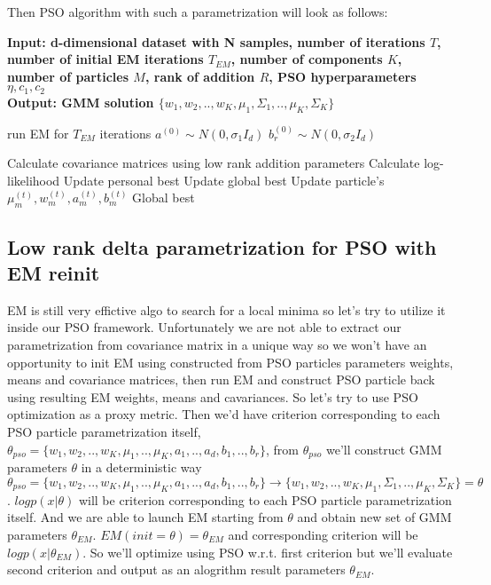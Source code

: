 \documentclass[a4paper]{article}
\begin{document}
 Then PSO algorithm with such a parametrization will look as follows:
 \begin{algorithm}
    \caption{}\label{alg:cap}
    \hspace*{\algorithmicindent} \textbf{Input: d-dimensional dataset with N samples, number of iterations $T$, number of initial EM iterations $T_{EM}$, 
    number of components $K$, number of particles $M$, rank of addition $R$,
    PSO hyperparameters $\eta, c_1, c_2$} \\
    \hspace*{\algorithmicindent} \textbf{Output: GMM solution $\{w_1, w_2, .., w_K, \mu_1, \Sigma_1, .., \mu_K, \Sigma_K\}$} 
    \begin{algorithmic}
    \State run EM for $T_{EM}$ iterations
        \State $a^{(0)}\sim N(0, \sigma_1I_d)$ 
            \State $b^{(0)}_r \sim N(0, \sigma_2 I_d)$
        \EndFor
    \EndFor
    
            \State Calculate covariance matrices using low rank addition parameters
            \State Calculate log-likelihood
            \State Update personal best
         \EndFor
         \State Update global best
            \State Update particle's $\mu_m^{(t)}, w_m^{(t)}, a_m^{(t)}, b_m^{(t)}$
         \EndFor
     \EndFor
     \State \Return Global best
     \end{algorithmic}
     \end{algorithm}

\subsection{Low rank delta parametrization for PSO with EM reinit}

EM is still very effictive algo to search for a local minima so let's try to utilize it inside our PSO framework. 
Unfortunately we are not able to extract our parametrization from covariance matrix in a unique way so we won't have an 
opportunity to init EM using constructed from PSO particles parameters weights, means and covariance matrices, then run EM 
and construct PSO particle back using resulting EM weights, means and cavariances. So let's try to use PSO optimization as a proxy metric.
Then we'd have criterion corresponding to each PSO particle parametrization itself,
$\theta_{pso} = \{w_1, w_2, .., w_K, \mu_1, .., \mu_K, a_1, .., a_d, b_1, .., b_r\}$, from $\theta_{pso}$  we'll construct GMM parameters $\theta$ in a deterministic way
$\theta_{pso} = \{w_1, w_2, .., w_K, \mu_1, .., \mu_K, a_1, .., a_d, b_1, .., b_r\} \rightarrow \{w_1, w_2, .., w_K, \mu_1, \Sigma_1, .., \mu_K, \Sigma_K\} = \theta$. 
$log p(x | \theta)$ will be criterion corresponding to each PSO particle parametrization itself. And we are able to launch EM starting from 
$\theta$ and obtain new set of GMM parameters $\theta_{EM}$. $EM(init=\theta) = \theta_{EM}$ and corresponding criterion will be $logp(x |\theta_{EM})$.
So we'll optimize using PSO w.r.t. first criterion but we'll evaluate second criterion and output as an alogrithm result parameters $\theta_{EM}$.
\end{document}
